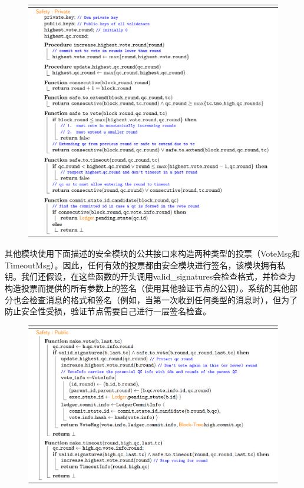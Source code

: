 \begin{figure}[H]
    \centering
    \includegraphics[width=12cm]{figures/code6.png}
\end{figure}

其他模块使用下面描述的安全模块的公共接口来构造两种类型的投票（VoteMsg和 TimeoutMsg）。因此，任何有效的投票都由安全模块进行签名，该模块拥有私钥。我们还假设，在这些函数的开头调用valid\_signatures会检查格式，并检查为构造投票而提供的所有参数上的签名（使用其他验证节点的公钥）。系统的其他部分也会检查消息的格式和签名（例如，当第一次收到任何类型的消息时），但为了防止安全性受损，验证节点需要自己进行一层签名检查。

\begin{figure}[H]
    \centering
    \includegraphics[width=12cm]{figures/code7.png}
\end{figure}


